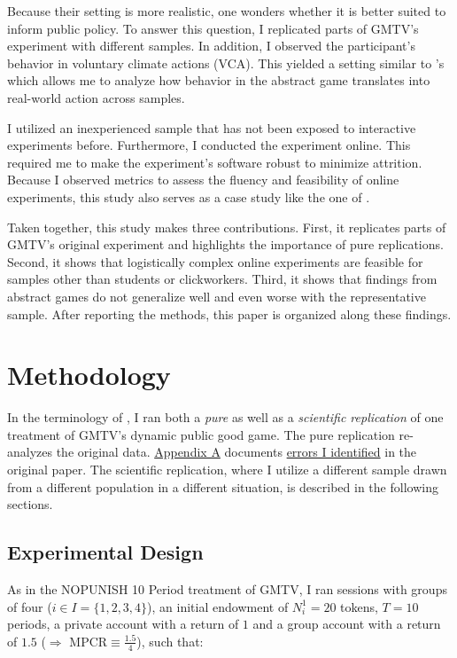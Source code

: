\documentclass[
  authoryear,
  preprint,
  3p]{elsarticle}
\begin{document}
Because their setting is more realistic, one wonders whether it is
better suited to inform public policy. To answer this question, I
replicated parts of GMTV's experiment with different samples. In
addition, I observed the participant's behavior in voluntary climate
actions (VCA). This yielded a setting similar to \citet{GKLS2020}'s
which allows me to analyze how behavior in the abstract game translates
into real-world action across samples.

I utilized an inexperienced sample that has not been exposed to
interactive experiments before. Furthermore, I conducted the experiment
online. This required me to make the experiment's software robust to
minimize attrition. Because I observed metrics to assess the fluency and
feasibility of online experiments, this study also serves as a case
study like the one of \citet{AGM2018}.

Taken together, this study makes three contributions. First, it
replicates parts of GMTV's original experiment and highlights the
importance of pure replications. Second, it shows that logistically
complex online experiments are feasible for samples other than students
or clickworkers. Third, it shows that findings from abstract games do
not generalize well and even worse with the representative sample. After
reporting the methods, this paper is organized along these findings.

\hypertarget{sec-methods}{%
\section{Methodology}\label{sec-methods}}

In the terminology of \citet{Hamermesh2007}, I ran both a \emph{pure} as
well as a \emph{scientific replication} of one treatment of GMTV's
dynamic public good game. The pure replication re-analyzes the original
data. \protect\hyperlink{A:-Pure-Replication}{Appendix A} documents
\href{}{errors I identified} in the original paper. The scientific
replication, where I utilize a different sample drawn from a different
population in a different situation, is described in the following
sections.

\hypertarget{sec-design}{%
\subsection{Experimental Design}\label{sec-design}}

As in the NOPUNISH 10 Period treatment of GMTV, I ran sessions with
groups of four (\(i \in I=\{1,2,3,4\}\)), an initial endowment of
\(N_i^1 = 20\) tokens, \(T=10\) periods, a private account with a return
of \(1\) and a group account with a return of \(1.5\) (\(\Rightarrow\)
MPCR\(\equiv \frac{1.5}{4}\)), such that:
\end{document}
